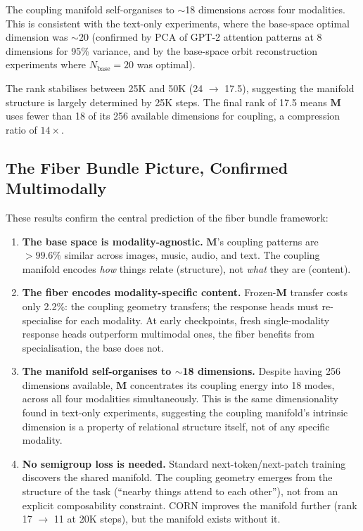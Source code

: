 \documentclass[11pt, a4paper]{article}
\newcommand{\M}{\mathbf{M}}
\theoremstyle{plain}
\theoremstyle{remark}
\begin{document}
The coupling manifold self-organises to $\sim$18 dimensions across four modalities.
This is consistent with the text-only experiments, where the base-space optimal dimension was $\sim$20 (confirmed by PCA of GPT-2 attention patterns at 8 dimensions for 95\% variance, and by the base-space orbit reconstruction experiments where $N_{\text{base}} = 20$ was optimal).

The rank stabilises between 25K and 50K (24 $\to$ 17.5), suggesting the manifold structure is largely determined by 25K steps.
The final rank of 17.5 means $\M$ uses fewer than 18 of its 256 available dimensions for coupling, a compression ratio of $14\times$.

\subsection{The Fiber Bundle Picture, Confirmed Multimodally}

These results confirm the central prediction of the fiber bundle framework:

\begin{enumerate}[nosep]
    \item \textbf{The base space is modality-agnostic.}
    $\M$'s coupling patterns are $> 99.6\%$ similar across images, music, audio, and text.
    The coupling manifold encodes \emph{how} things relate (structure), not \emph{what} they are (content).

    \item \textbf{The fiber encodes modality-specific content.}
    Frozen-$\M$ transfer costs only 2.2\%: the coupling geometry transfers; the response heads must re-specialise for each modality.
    At early checkpoints, fresh single-modality response heads outperform multimodal ones, the fiber benefits from specialisation, the base does not.

    \item \textbf{The manifold self-organises to $\sim$18 dimensions.}
    Despite having 256 dimensions available, $\M$ concentrates its coupling energy into 18 modes, across all four modalities simultaneously.
    This is the same dimensionality found in text-only experiments, suggesting the coupling manifold's intrinsic dimension is a property of relational structure itself, not of any specific modality.

    \item \textbf{No semigroup loss is needed.}
    Standard next-token/next-patch training discovers the shared manifold.
    The coupling geometry emerges from the structure of the task (``nearby things attend to each other''), not from an explicit composability constraint.
    CORN improves the manifold further (rank 17 $\to$ 11 at 20K steps), but the manifold exists without it.
\end{enumerate}
\end{document}
